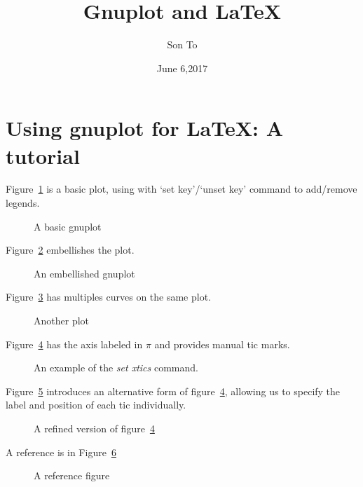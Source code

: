 \documentclass[a4paper,11pt]{article}
\title{Gnuplot and LaTeX}
\author{Son To}
\date{June 6,2017}
\begin{document}
\maketitle
\tableofcontents
\newpage
\section{Using gnuplot for LaTeX: A tutorial}
Figure~\ref{fig:eg1} is a basic plot, using with `set key'/`unset key'
command to add/remove legends.
  \begin{figure}
    \begin{center}
      
      \caption{A basic gnuplot}
      \label{fig:eg1}
    \end{center}
  \end{figure}

Figure~\ref{fig:eg2} embellishes the plot.
\begin{figure}
  \begin{center}
    
    \caption{An embellished gnuplot}
    \label{fig:eg2}
  \end{center}
\end{figure}

Figure~\ref{fig:eg3} has multiples curves on the same plot.
\begin{figure}
  \begin{center}
    
    \caption{Another plot}
    \label{fig:eg3}
  \end{center}
\end{figure}

Figure~\ref{fig:eg4} has the axis labeled in $\pi$
and provides manual tic marks.
\begin{figure}
\begin{center}
  
  \caption{An example of the \emph{set xtics} command.}
  \label{fig:eg4}
\end{center}
\end{figure}

Figure~\ref{fig:eg5} introduces an alternative form of
figure~\ref{fig:eg4}, allowing us to specify the label
and position of each tic individually.
\begin{figure}
\begin{center}
  
  \caption{A refined version of figure~\ref{fig:eg4}}
  \label{fig:eg5}
\end{center}
\end{figure}

A reference is in Figure~\ref{fig:ref}
\begin{figure}
  \begin{center}
  
  \caption{A reference figure}
  \label{fig:ref}
\end{center}
\end{figure}
\end{document}
